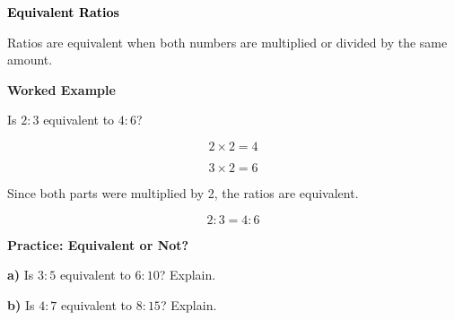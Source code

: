 \documentclass[12pt, letterpaper, fleqn]{article}
\begin{document}
\newpage

\begin{tcolorbox}[colback=customteal!20]
\large\textcolor{black}{\textbf{Equivalent Ratios}}
\end{tcolorbox}

\noindent
Ratios are equivalent when both numbers are multiplied or divided by the same amount.

\vspace{3mm}

\begin{tcolorbox}[colback=white, colframe=black!25, boxrule=0.6pt, arc=4mm, left=6mm, right=6mm, top=5mm, bottom=5mm]

\textbf{Worked Example}

\medskip

Is $2:3$ equivalent to $4:6$?

\[
2 \times 2 = 4
\]

\[
3 \times 2 = 6
\]

Since both parts were multiplied by 2, the ratios are equivalent.

\[
2:3 = 4:6
\]


\end{tcolorbox}

\vspace{4mm}

\begin{tcolorbox}[colback=white!15, colframe=black, boxrule=1.5pt, arc=4mm, left=6mm, right=6mm, top=5mm, bottom=5mm]

\textbf{Practice: Equivalent or Not?}

\medskip

\noindent
\textbf{a)} Is $3:5$ equivalent to $6:10$? Explain.

\vspace{3cm}

\noindent
\textbf{b)} Is $4:7$ equivalent to $8:15$? Explain.

\vspace{3cm}

\end{tcolorbox}

\newpage
\end{document}
